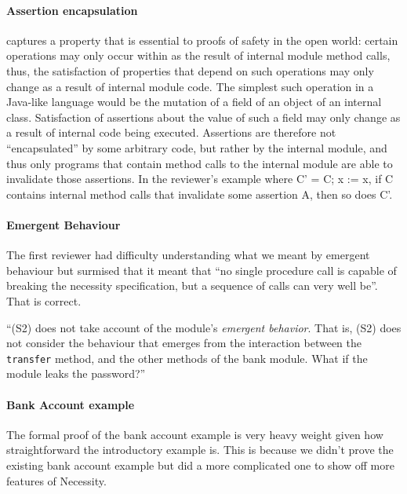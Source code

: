 \documentclass[11pt]{amsart}
\begin{document}
\paragraph{Assertion encapsulation} captures a property that is essential to proofs of safety in the open world: certain operations may only occur within as the result of internal module method calls, thus, the satisfaction of properties that depend on such operations may only change as a result of internal module code. The simplest such operation in a Java-like language would be the mutation of a field of an object of an internal class. Satisfaction of assertions about the value of such a field may only change as a result of internal code being executed. Assertions are therefore not ``encapsulated'' by some arbitrary code, but rather by the internal module, and thus only programs that contain method calls to the internal module are able to invalidate those assertions. In the reviewer's example where C' = C; x := x, if C contains internal method calls that invalidate some assertion A, then so does C'.

\paragraph{Emergent Behaviour} 
The first reviewer had difficulty understanding what we meant by emergent behaviour but surmised that it meant that  ``no single procedure call is capable of breaking the necessity specification, but a sequence of calls can very well be''. That is correct.

``(S2) does not take account of the module's \emph{emergent behavior}. That is, (S2) does not consider the behaviour that emerges from the interaction between the 
\texttt{transfer} method, and the other methods of the bank module. What if the module leaks the password?''

\paragraph{Bank Account example} The formal proof of the bank account example is very heavy weight given how straightforward the introductory example is. This is because we didn't prove the existing bank account example but did a more complicated one to show off more features of Necessity.
\end{document}
